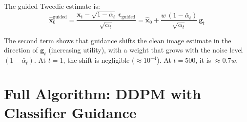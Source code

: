 \documentclass[11pt]{article}
\newcommand{\xb}{\mathbf{x}}
\newcommand{\eb}{\boldsymbol{\epsilon}}
\newcommand{\gb}{\mathbf{g}}
\newcommand{\alphabar}{\bar{\alpha}}
\begin{document}
The guided Tweedie estimate is:
\begin{equation}
    \hat{\xb}_0^{\text{guided}}
    = \frac{\xb_t - \sqrt{1-\alphabar_t}\, \eb_{\text{guided}}}{\sqrt{\alphabar_t}}
    = \hat{\xb}_0 + \frac{w\,(1-\alphabar_t)}{\sqrt{\alphabar_t}}\, \gb_t
    \label{eq:x0_guided}
\end{equation}

The second term shows that guidance shifts the clean image estimate in the direction
of $\gb_t$ (increasing utility), with a weight that grows with the noise level
$(1 - \alphabar_t)$. At $t=1$, the shift is negligible ($\approx 10^{-4}$).
At $t=500$, it is $\approx 0.7 w$.

\section{Full Algorithm: DDPM with Classifier Guidance}
\label{sec:algorithm_ddpm}
\end{document}
